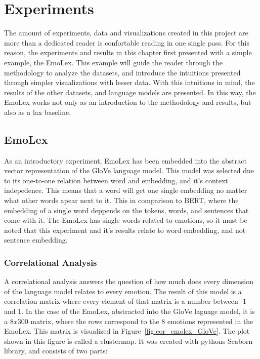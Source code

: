 \chapter{Experiments}\label{chap:Experiments}
The amount of experiments, data and visualizations created in this project are more than a dedicated reader is confortable reading in one single pass. For this reason, the experiments and results in this chapter first presented with a simple example, the EmoLex. This example will guide the reader through the methodology to analyze the datasets, and introduce the intuitions presented through simpler visualizations with lesser data. With this intuitions in mind, the results of the other datasets, and language models are presented. In this way, the EmoLex works not only as an introduction to the methodology and results, but also as a lax baseline.

\section{EmoLex}\label{sec:EmoLex}
As an introductory experiment, EmoLex has been embedded into the abstract vector representation of the GloVe language model. This model was selected due to its one-to-one relation between word and embedding, and it's context indepedence. This means that a word will get one single embedding no matter what other words apear next to it. This in comparison to BERT, where the embedding of a single word deppends on the tokens, words, and sentences that come with it. The EmoLex has single words related to emotions, so it must be noted that this experiment and it's results relate to word embedding, and not sentence embedding.

\subsection{Correlational Analysis}
A correlational analysis answers the question of how much does every dimension of the language model relates to every emotion. The result of this model is a correlation matrix where every element of that matrix is a number between -1 and 1.
In the case of the EmoLex, abstracted into the GloVe laguage model, it is a $8x300$ matrix, where the rows correspond to the 8 emotions represented in the EmoLex. This matrix is visualized in Figure~\ref{fig:cor_emolex_GloVe}. The plot shown in this figure is called a clustermap. It was created with pythons Seaborn library, and consists of two parts:

